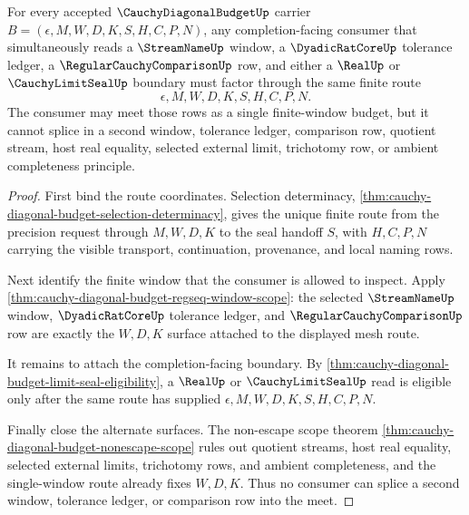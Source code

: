 \begin{theorem}
\label{thm:cauchy-diagonal-budget-window-meet-lock}
For every accepted $\CauchyDiagonalBudgetUp$ carrier $B=(\epsilon,M,W,D,K,S,H,C,P,N)$, any completion-facing consumer that simultaneously reads a $\StreamNameUp$ window, a $\DyadicRatCoreUp$ tolerance ledger, a $\RegularCauchyComparisonUp$ row, and either a $\RealUp$ or $\CauchyLimitSealUp$ boundary must factor through the same finite route
$$
\epsilon,M,W,D,K,S,H,C,P,N.
$$
The consumer may meet those rows as a single finite-window budget, but it cannot splice in a second window, tolerance ledger, comparison row, quotient stream, host real equality, selected external limit, trichotomy row, or ambient completeness principle.
\end{theorem}
\begin{proof}
First bind the route coordinates. Selection determinacy, \autoref{thm:cauchy-diagonal-budget-selection-determinacy}, gives the unique finite route from the precision request through $M,W,D,K$ to the seal handoff $S$, with $H,C,P,N$ carrying the visible transport, continuation, provenance, and local naming rows.

Next identify the finite window that the consumer is allowed to inspect. Apply \autoref{thm:cauchy-diagonal-budget-regseq-window-scope}: the selected $\StreamNameUp$ window, $\DyadicRatCoreUp$ tolerance ledger, and $\RegularCauchyComparisonUp$ row are exactly the $W,D,K$ surface attached to the displayed mesh route.

It remains to attach the completion-facing boundary. By \autoref{thm:cauchy-diagonal-budget-limit-seal-eligibility}, a $\RealUp$ or $\CauchyLimitSealUp$ read is eligible only after the same route has supplied $\epsilon,M,W,D,K,S,H,C,P,N$.

Finally close the alternate surfaces. The non-escape scope theorem \autoref{thm:cauchy-diagonal-budget-nonescape-scope} rules out quotient streams, host real equality, selected external limits, trichotomy rows, and ambient completeness, and the single-window route already fixes $W,D,K$. Thus no consumer can splice a second window, tolerance ledger, or comparison row into the meet.
\end{proof}

